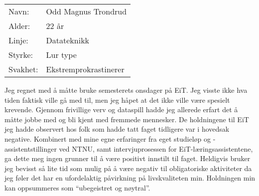 \begin{table}[H]
\begin{tabular}{l l}
        Navn: & Odd Magnus Trondrud \\
        Alder: & 22 år \\ 
        Linje: & Datateknikk \\
        Styrke: & Lur type \\
        Svakhet: & Ekstremprokrastinerer
    \end{tabular}
\end{table}

Jeg regnet med å måtte bruke semesterets onsdager på EiT.
Jeg visste ikke hva tiden faktisk ville gå med til, men jeg håpet at det ikke ville være spesielt krevende.
Gjennom frivillige verv og dataspill hadde jeg allerede erfart det å måtte jobbe med og bli kjent med fremmede mennesker.
De holdningene til EiT jeg hadde observert hos folk som hadde tatt faget tidligere var i hovedsak negative.
Kombinert med mine egne erfaringer fra eget studieløp og -assistentstillinger ved NTNU, samt intervjuprosessen for EiT-læringsassistentene, ga dette meg ingen grunner til å være positivt innstilt til faget.
Heldigvis bruker jeg bevisst så lite tid som mulig på å være negativ til obligatoriske aktiviteter da jeg føler det har en ufordelaktig påvirkning på livskvaliteten min.
Holdningen min kan oppsummeres som ``ubegeistret og nøytral''.

